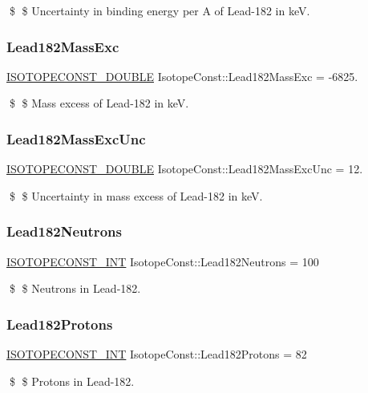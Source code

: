 \$ \$ Uncertainty in binding energy per A of Lead-\/182 in keV. \mbox{\label{group___isotope_const-_lead-_pb182_ga427e901f866627d36167b8a875599b95}} 
\subsubsection{\texorpdfstring{Lead182\+Mass\+Exc}{Lead182MassExc}}
{\footnotesize\ttfamily \mbox{\hyperlink{group___isotope_const-_macros_ga8f45a7272ce02c0b4c65c44636ed719a}{I\+S\+O\+T\+O\+P\+E\+C\+O\+N\+S\+T\+\_\+\+D\+O\+U\+B\+LE}} Isotope\+Const\+::\+Lead182\+Mass\+Exc = -\/6825.}

\$ \$ Mass excess of Lead-\/182 in keV. \mbox{\label{group___isotope_const-_lead-_pb182_ga56fa41dc5cd2fed3f4bd61f371645576}} 
\subsubsection{\texorpdfstring{Lead182\+Mass\+Exc\+Unc}{Lead182MassExcUnc}}
{\footnotesize\ttfamily \mbox{\hyperlink{group___isotope_const-_macros_ga8f45a7272ce02c0b4c65c44636ed719a}{I\+S\+O\+T\+O\+P\+E\+C\+O\+N\+S\+T\+\_\+\+D\+O\+U\+B\+LE}} Isotope\+Const\+::\+Lead182\+Mass\+Exc\+Unc = 12.}

\$ \$ Uncertainty in mass excess of Lead-\/182 in keV. \mbox{\label{group___isotope_const-_lead-_pb182_gac85829e90acf7197258819fc400b85b8}} 
\subsubsection{\texorpdfstring{Lead182\+Neutrons}{Lead182Neutrons}}
{\footnotesize\ttfamily \mbox{\hyperlink{group___isotope_const-_macros_ga5f18360b3e99483a35c32d789e62621c}{I\+S\+O\+T\+O\+P\+E\+C\+O\+N\+S\+T\+\_\+\+I\+NT}} Isotope\+Const\+::\+Lead182\+Neutrons = 100}

\$ \$ Neutrons in Lead-\/182. \mbox{\label{group___isotope_const-_lead-_pb182_ga36954292d80f05d132811d2ba35f7cab}} 
\subsubsection{\texorpdfstring{Lead182\+Protons}{Lead182Protons}}
{\footnotesize\ttfamily \mbox{\hyperlink{group___isotope_const-_macros_ga5f18360b3e99483a35c32d789e62621c}{I\+S\+O\+T\+O\+P\+E\+C\+O\+N\+S\+T\+\_\+\+I\+NT}} Isotope\+Const\+::\+Lead182\+Protons = 82}

\$ \$ Protons in Lead-\/182. 